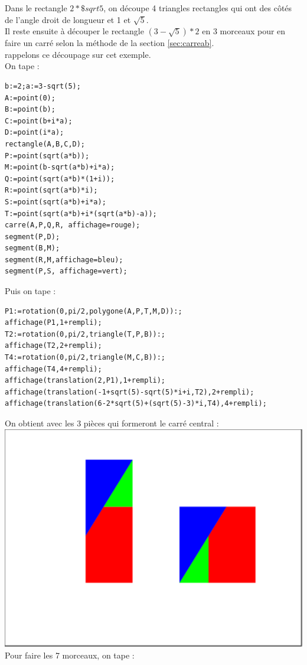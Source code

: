 \documentclass[a4paper,11pt]{book}
\begin{document}
Dans le rectangle $2*\$sqrt 5$, on d\'ecoupe 4 triangles rectangles qui ont des 
c\^ot\'es de l'angle droit de longueur et 1 et $\sqrt 5$. \\
Il reste ensuite \`a d\'ecouper le rectangle $(3-\sqrt 5)*2$ en 3 morceaux pour
en faire un carr\'e selon la m\'ethode de la section \ref{sec:carreab}.\\
rappelons ce d\'ecoupage sur cet exemple.\\
On tape :
\begin{verbatim}
b:=2;a:=3-sqrt(5);
A:=point(0);
B:=point(b);
C:=point(b+i*a);
D:=point(i*a);
rectangle(A,B,C,D);
P:=point(sqrt(a*b));
M:=point(b-sqrt(a*b)+i*a);
Q:=point(sqrt(a*b)*(1+i));
R:=point(sqrt(a*b)*i);
S:=point(sqrt(a*b)+i*a);
T:=point(sqrt(a*b)+i*(sqrt(a*b)-a));
carre(A,P,Q,R, affichage=rouge);
segment(P,D);
segment(B,M);
segment(R,M,affichage=bleu);
segment(P,S, affichage=vert);
\end{verbatim}
Puis on tape :
\begin{verbatim}
P1:=rotation(0,pi/2,polygone(A,P,T,M,D)):;
affichage(P1,1+rempli);
T2:=rotation(0,pi/2,triangle(T,P,B)):;
affichage(T2,2+rempli);
T4:=rotation(0,pi/2,triangle(M,C,B)):;
affichage(T4,4+rempli);
affichage(translation(2,P1),1+rempli);
affichage(translation(-1+sqrt(5)-sqrt(5)*i+i,T2),2+rempli);
affichage(translation(6-2*sqrt(5)+(sqrt(5)-3)*i,T4),4+rempli);
\end{verbatim}
On obtient avec les 3 pi\`eces qui formeront le carr\'e central :\\
\includegraphics[width=\textwidth]{carresqrt36}\\
Pour faire les 7 morceaux, on tape :
\end{document}
